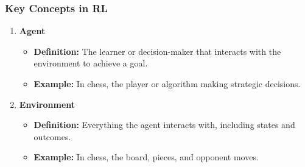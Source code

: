 \documentclass[aspectratio=169]{beamer}
\begin{document}
\begin{frame}[fragile]
    \frametitle{Key Concepts in RL}
    \begin{enumerate}
        \item \textbf{Agent}
        \begin{itemize}
            \item \textbf{Definition:} The learner or decision-maker that interacts with the environment to achieve a goal.
            \item \textbf{Example:} In chess, the player or algorithm making strategic decisions.
        \end{itemize}

        \item \textbf{Environment}
        \begin{itemize}
            \item \textbf{Definition:} Everything the agent interacts with, including states and outcomes.
            \item \textbf{Example:} In chess, the board, pieces, and opponent moves.
        \end{itemize}
    \end{enumerate}
\end{frame}
\end{document}
